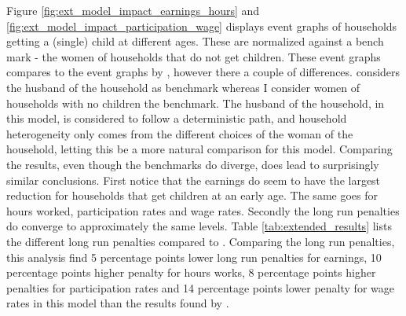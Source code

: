 Figure \ref{fig:ext_model_impact_earnings_hours} and \ref{fig:ext_model_impact_participation_wage} displays event graphs of households getting a (single) child at different ages. These are normalized against a bench mark - the women of households that do not get children. These event graphs compares to the event graphs by \textcite{kleven_children_2019}, however there a couple of differences. \textcite{kleven_children_2019} considers the husband of the household as benchmark whereas I consider women of households with no children the benchmark. The husband of the household, in this model, is considered to follow a deterministic path, and household heterogeneity only comes from the different choices of the woman of the household, letting this be a more natural comparison for this model. Comparing the results, even though the benchmarks do diverge, does lead to surprisingly similar conclusions. First notice that the earnings do seem to have the largest reduction for households that get children at an early age. The same goes for hours worked, participation rates and wage rates. Secondly the long run penalties do converge to approximately the same levels. Table \ref{tab:extended_results} lists the different long run penalties compared to \textcite{kleven_children_2019}. Comparing the long run penalties, this analysis find 5 percentage points lower long run penalties for earnings, 10 percentage points higher penalty for hours works, 8 percentage points higher penalties for participation rates and 14 percentage points lower penalty for wage rates in this model than the results found by \textcite{kleven_children_2019}.

